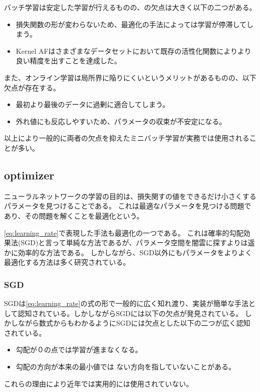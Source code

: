 バッチ学習は安定した学習が行えるものの、の欠点は大きく以下の二つがある。

\begin{itemize}
  \item 損失関数の形が変わらないため、最適化の手法によっては学習が停滞してしまう。
  \item Kernel AFはさまざまなデータセットにおいて既存の活性化関数によりより良い精度を出すことを達成した。
\end{itemize}

また、オンライン学習は局所界に陥りにくいというメリットがあるものの、以下欠点が存在する。

\begin{itemize}
  \item 最初より最後のデータに過剰に適合してしまう。
  \item 外れ値にも反応しやすいため、パラメータの収束が不安定になる。
\end{itemize}

以上により一般的に両者の欠点を抑えたミニバッチ学習が実務では使用されることが多い。


\subsection{optimizer}
ニューラルネットワークの学習の目的は、損失関すの値をできるだけ小さくするパラメータを見つけることである。
これは最適なパラメータを見つける問題であり、その問題を解くことを最適化という。

\ref{eq:learning_rate}で表現した手法も最適化の一つである。
これは確率的勾配効果法(SGD)と言って単純な方法であるが、パラメータ空間を闇雲に探すよりは遥かに効率的な方法である。
しかしながら、SGD以外にもパラメータをよりよく最適化する方法は多く研究されている。

\subsubsection{SGD}
SGDは\ref{eq:learning_rate}の式の形で一般的に広く知れ渡り、実装が簡単な手法として認知されている。しかしながらSGDには以下の欠点が発見されている。
しかしながら数式からもわかるようにSGDには欠点とした以下の二つが広く認知されている。

\begin{itemize}
  \item 勾配が０の点では学習が進まなくなる。
  \item 勾配の方向が本来の最小値では ない方向を指していないことがある。
\end{itemize}
これらの理由により近年では実用的には使用されていない。

